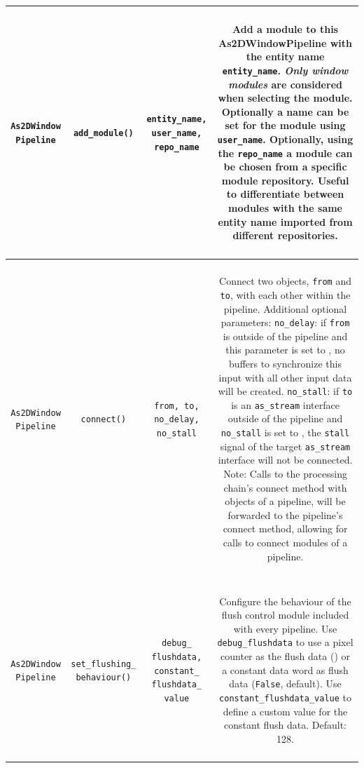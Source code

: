 \begin{longtable}[htbp]{|c|c|c|c|}
\parbox{2.5cm}{~\\ \texttt{As2DWindow Pipeline}\\~} & \parbox{3cm}{~\\ \texttt{add\_module()}\\~} & \parbox{3cm}{~ \\ \texttt{entity\_name, user\_name, repo\_name} \\ ~} & \parbox{6cm}{~\\ Add a module to this As2DWindowPipeline with the entity name \texttt{entity\_name}. \emph{Only window modules} are considered when selecting the module. Optionally a name can be set for the module using \texttt{user\_name}. Optionally, using the \texttt{repo\_name} a module can be chosen from a specific module repository. Useful to differentiate between modules with the same entity name imported from different repositories.  \\~}\\
\hline
\parbox{2.5cm}{~\\ \texttt{As2DWindow Pipeline}\\~} & \parbox{3cm}{~\\ \texttt{connect()}\\~} & \parbox{3cm}{~ \\ \texttt{from, to, no\_delay, no\_stall} \\ ~} & \parbox{6cm}{~\\ Connect two objects, \texttt{from} and \texttt{to}, with each other within the pipeline. Additional optional parameters: \texttt{no\_delay}: if \texttt{from} is outside of the pipeline and this parameter is set to , no buffers to synchronize this input with all other input data will be created. \texttt{no\_stall}: if \texttt{to} is an \texttt{as\_stream} interface outside of the pipeline and \texttt{no\_stall} is set to , the \texttt{stall} signal of the target \texttt{as\_stream} interface will not be connected. Note: Calls to the processing chain's connect method with objects of a pipeline, will be forwarded to the pipeline's connect method, allowing for  calls to connect modules of a pipeline.\\~}\\
\hline
\parbox{2.5cm}{~\\ \texttt{As2DWindow Pipeline}\\~} & \parbox{3cm}{~\\ \texttt{set\_flushing\_ behaviour()}\\~} & \parbox{3cm}{~ \\ \texttt{debug\_ flushdata, constant\_ flushdata\_ value} \\ ~} & \parbox{6cm}{~\\ Configure the behaviour of the flush control module included with every pipeline. Use \texttt{debug\_flushdata} to use a pixel counter as the flush data () or a constant data word as flush data (\texttt{False}, default). Use \texttt{constant\_flushdata\_value} to define a custom value for the constant flush data. Default: 128. \\~}\\

\end{longtable}
